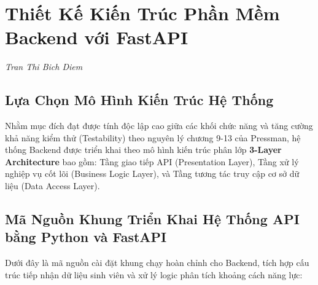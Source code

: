 \chapter{Thiết Kế Kiến Trúc Phần Mềm Backend với FastAPI}
\label{ch:backend_architecture}
\textit{Tran Thi Bich Diem}

\section{Lựa Chọn Mô Hình Kiến Trúc Hệ Thống}
Nhằm mục đích đạt được tính độc lập cao giữa các khối chức năng và tăng cường khả năng kiểm thử (Testability) theo nguyên lý chương 9-13 của Pressman, hệ thống Backend được triển khai theo mô hình kiến trúc phân lớp \textbf{3-Layer Architecture} bao gồm: Tầng giao tiếp API (Presentation Layer), Tầng xử lý nghiệp vụ cốt lõi (Business Logic Layer), và Tầng tương tác truy cập cơ sở dữ liệu (Data Access Layer).

\section{Mã Nguồn Khung Triển Khai Hệ Thống API bằng Python và FastAPI}
Dưới đây là mã nguồn cài đặt khung chạy hoàn chỉnh cho Backend, tích hợp cấu trúc tiếp nhận dữ liệu sinh viên và xử lý logic phân tích khoảng cách năng lực:

